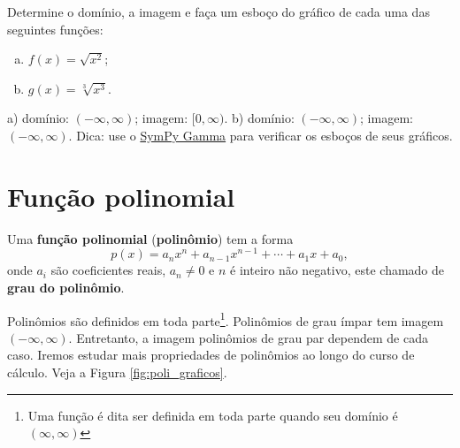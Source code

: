 \begin{exer}
  Determine o domínio, a imagem e faça um esboço do gráfico de cada uma das seguintes funções:
  \begin{enumerate}[a)]
  \item $\displaystyle f(x) = \sqrt{x^2}$;
  \item $\displaystyle g(x) = \sqrt[3]{x^3}$.
  \end{enumerate}
\end{exer}
\begin{resp}
  a) domínio: $(-\infty, \infty)$; imagem: $[0, \infty)$. b) domínio: $(-\infty, \infty)$; imagem: $(-\infty, \infty)$. Dica: use o \href{https://www.sympygamma.com/}{SymPy Gamma} para verificar os esboços de seus gráficos.
\end{resp}


\section{Função polinomial}\label{cap_funcao_sec_funpoli}

Uma {\bf função polinomial} ({\bf polinômio}) tem a forma
\begin{equation}
  p(x) = a_nx^n + a_{n-1}x^{n-1} + \cdots + a_1x + a_0,
\end{equation}
onde $a_i$ são coeficientes reais, $a_n\neq 0$ e $n$ é inteiro não negativo, este chamado de {\bf grau do polinômio}.

Polinômios são definidos em toda parte\footnote{Uma função é dita ser definida em toda parte quando seu domínio é $(\infty, \infty)$}. Polinômios de grau ímpar tem imagem $(-\infty, \infty)$. Entretanto, a imagem polinômios de grau par dependem de cada caso. Iremos estudar mais propriedades de polinômios ao longo do curso de cálculo. Veja a Figura \ref{fig:poli_graficos}.

